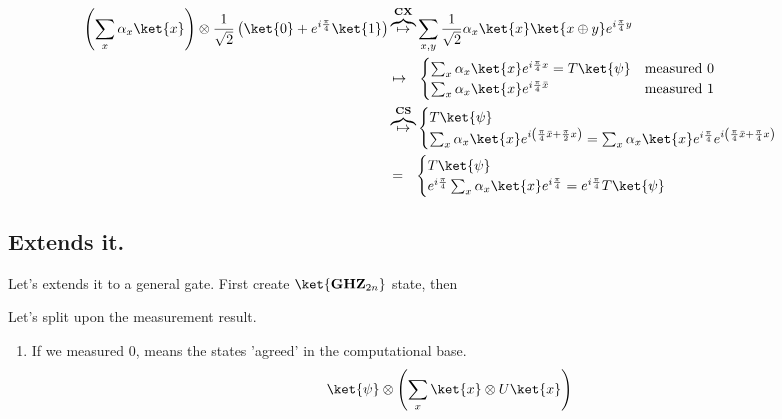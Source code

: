 \documentclass[12pt,a4paper]{article}
\begin{document}
\begin{equation*}
    \begin{split}
        \left(\sum_{x}\alpha_{x}\ket{x}\right)\otimes\frac{1}{\sqrt{2}} \left(  \ket{0} + e^{i\frac{\pi}{4}}\ket{1}\right) & \overbrace{  \mapsto }^{ \textbf{CX} } \sum_{x,y}\frac{1}{\sqrt{2}}\alpha_{x}\ket{x}\ket{x\oplus y}e^{i\frac{\pi}{4} y} \\ 
        & \mapsto \ \ \begin{cases}
         \sum_{x}\alpha_x\ket{x}e^{i\frac{\pi}{4}x} = T\ket{\psi}   & \text{measured } 0 \\
           \sum_{x}\alpha_x\ket{x}e^{i\frac{\pi}{4}\bar{x}} & \text{measured } 1
        \end{cases} \\ 
        & \overbrace{  \mapsto }^{ \textbf{CS} } \begin{cases}
          T\ket{\psi}    \\
           \sum_{x}\alpha_x\ket{x}e^{i\left( \frac{\pi}{4}\bar{x} + \frac{\pi}{2}x \right)} =  \sum_{x}\alpha_x\ket{x}e^{i\frac{\pi}{4}}e^{i\left( \frac{\pi}{4}\bar{x} + \frac{\pi}{4}x \right)}
        \end{cases} \\ 
        & = \ \ \begin{cases}
          T\ket{\psi}    \\
           e^{i\frac{\pi}{4} } \sum_{x}\alpha_x\ket{x}e^{i\frac{\pi}{4}} = e^{i\frac{\pi}{4} } T\ket{\psi}
        \end{cases} 
    \end{split}
\end{equation*}

\subsection{Extends it.}

Let's extends it to a general gate. First create $\ket{\textbf{GHZ}_{2n}}$ state, then 

Let's split upon the measurement result. 
\begin{enumerate}
    \item If we measured $0$, means the states 'agreed' in the computational base. 
      \begin{equation*}
    \begin{split}
          \ket{\psi} \otimes \left( \sum_x\ket{x}\otimes U\ket{x} \right)
    \end{split}
\end{equation*}
\end{enumerate}
\end{document}

